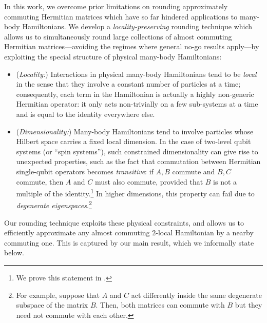 \documentclass[11pt]{article}
\theoremstyle{plain}
\begin{document}
In this work, we overcome prior limitations on rounding 
approximately commuting Hermitian matrices which have so far hindered 
applications to many-body Hamiltonians. We develop a 
\emph{locality-preserving} rounding technique which allows us to 
simultaneously
round large collections of almost commuting Hermitian matrices---avoiding the regimes where 
general no-go results apply---by exploiting the special structure of physical many-body Hamiltonians:
\begin{itemize}
\item (\emph{Locality:}) Interactions in physical many-body Hamiltonians tend 
to be \emph{local} in the sense that they involve a constant number of 
particles at a time; consequently, each term in the Hamiltonian is 
actually a 
highly non-generic Hermitian operator: it only acts non-trivially on a 
few sub-systems at a time and is equal to the identity everywhere else.

\item (\emph{Dimensionality:}) Many-body Hamiltonians tend to 
involve particles whose Hilbert space carries a fixed local dimension. 
In the case of two-level qubit systems (or ``spin systems''), such constrained dimensionality can give rise to unexpected properties, such as the fact that commutation between Hermitian single-qubit operators becomes 
\emph{transitive}: if $A,B$ commute and $B,C$ 
commute, then $A$ and $C$ must also commute, provided that $B$ is not 
a multiple of the identity.\footnote{We prove this statement in .} In higher dimensions, this property can fail due to \emph{degenerate eigenspaces}.\footnote{For example, suppose that $A$ and $C$ act differently inside the same degenerate subspace of the matrix $B$. Then, both matrices can commute with $B$ but they need not commute with each other.}
\end{itemize}




Our rounding technique exploits these physical constraints, 
and allows us to
efficiently approximate any almost commuting $2$-local 
Hamiltonian by a nearby commuting one.
This is captured by our main 
result, which we informally state below.
\end{document}
